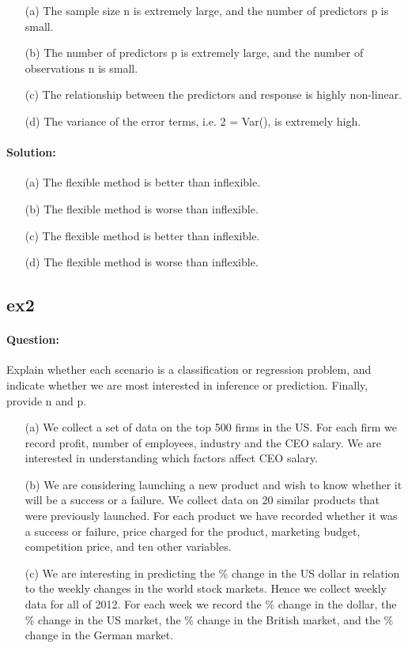 \documentclass[a4paper,12pt,titlepage]{article} %
\begin{document}
\begin{itemize}
	\item[(a)] The sample size n is extremely large, and the number of predictors p is small.
	\item[(b)] The number of predictors p is extremely large, and the number of observations n is small.
	\item[(c)] The relationship between the predictors and response is highly non-linear.
	\item[(d)] The variance of the error terms, i.e. 2 = Var(), is extremely high.
\end{itemize}

\paragraph{Solution:}
\begin{itemize}
	\item[(a)] The flexible method is better than inflexible.
	\item[(b)] The flexible method is worse  than inflexible.
	\item[(c)] The flexible method is better  than inflexible.
	\item[(d)] The flexible method is worse  than inflexible.
\end{itemize}

\subsection{ex2}
\paragraph{Question:} Explain whether each scenario is a classification or regression problem, and indicate whether we are most interested in inference or prediction. Finally, provide n and p.

\begin{itemize}
	\item[(a)] We collect a set of data on the top 500 firms in the US. For each firm we record profit, number of employees, industry and the CEO salary. We are interested in understanding which factors affect CEO salary.		
	\item[(b)] We are considering launching a new product and wish to know whether it will be a success or a failure. We collect data on 20 similar products that were previously launched. For each product we have recorded whether it was a success or failure, price charged for the product, marketing budget, competition price, and ten other variables.	
	\item[(c)] We are interesting in predicting the \% change in the US dollar in relation to the weekly changes in the world stock markets. Hence we collect weekly data for all of 2012. For each week we record the \% change in the dollar, the \% change in the US market, the \% change in the British market, and the \% change in the German market.
\end{itemize}
\end{document}
